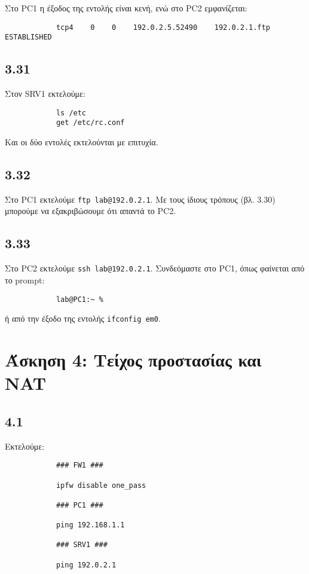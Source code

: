 \documentclass[a4paper, 12pt]{article}
\begin{document}
		Στο PC1 η έξοδος της εντολής είναι κενή, ενώ στο PC2 εμφανίζεται:
		
		\begin{verbatim}
			tcp4    0    0    192.0.2.5.52490    192.0.2.1.ftp ESTABLISHED
		\end{verbatim}

	\subsection*{3.31}
		Στον SRV1 εκτελούμε:
		
		\begin{verbatim}
			ls /etc
			get /etc/rc.conf
		\end{verbatim}
		
		Και οι δύο εντολές εκτελούνται με επιτυχία.
		
	\subsection*{3.32}
		Στο PC1 εκτελούμε \verb|ftp lab@192.0.2.1|. Με τους ίδιους τρόπους (βλ. 3.30) μπορούμε να εξακριβώσουμε ότι απαντά το PC2.

	\subsection*{3.33}
		Στο PC2 εκτελούμε \verb|ssh lab@192.0.2.1|. Συνδεόμαστε στο PC1, όπως φαίνεται από το prompt:
		
		\begin{verbatim}
			lab@PC1:~ %
		\end{verbatim}
		
		ή από την έξοδο της εντολής \verb|ifconfig em0|.

\section*{Άσκηση 4: Τείχος προστασίας και NAT}

	\subsection*{4.1} 
		Εκτελούμε:
		
		\begin{verbatim}
			### FW1 ###
			
			ipfw disable one_pass
			
			### PC1 ###
			
			ping 192.168.1.1 
			
			### SRV1 ###
			
			ping 192.0.2.1
		\end{verbatim}
		
\end{document}
